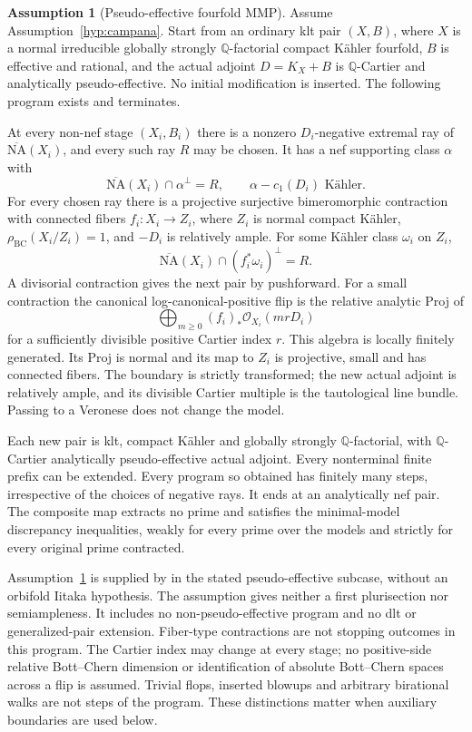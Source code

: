 \documentclass[11pt,letterpaper]{article}
\newcommand{\Q}{\mathbb{Q}}
\newcommand{\OO}{\mathcal{O}}
\newcommand{\NA}{\overline{\mathrm{NA}}}
\newcommand{\BC}{\mathrm{BC}}
\theoremstyle{definition}
\newtheorem{assumption}[theorem]{Assumption}
\theoremstyle{remark}
\begin{document}
\begin{assumption}[Pseudo-effective fourfold MMP]
\label{hyp:mmp}
Assume Assumption~\ref{hyp:campana}. Start from an ordinary klt pair
\((X,B)\), where \(X\) is a normal irreducible globally strongly
\(\Q\)-factorial compact K\"ahler fourfold, \(B\) is effective
and rational, and the actual adjoint \(D=K_X+B\) is
\(\Q\)-Cartier and analytically pseudo-effective. No initial
modification is inserted. The following program exists and
terminates.

At every non-nef stage \((X_i,B_i)\) there is a nonzero
\(D_i\)-negative extremal ray of \(\NA(X_i)\), and every such
ray \(R\) may be chosen. It has a nef supporting class \(\alpha\)
with
\[
 \NA(X_i)\cap\alpha^\perp=R,
 \qquad \alpha-c_1(D_i)\text{ K\"ahler}.
\]
For every chosen ray there is a projective surjective bimeromorphic
contraction with connected fibers
\(f_i:X_i\to Z_i\), where \(Z_i\) is normal compact K\"ahler,
\(\rho_{\BC}(X_i/Z_i)=1\), and \(-D_i\) is relatively ample.
For some K\"ahler class \(\omega_i\) on \(Z_i\),
\[
 \NA(X_i)\cap(f_i^*\omega_i)^\perp=R.
\]
A divisorial contraction gives the next pair by pushforward. For a
small contraction the canonical log-canonical-positive flip is the
relative analytic Proj of
\[
 \bigoplus_{m\ge0}(f_i)_*\OO_{X_i}(mrD_i)
\]
for a sufficiently divisible positive Cartier index \(r\). This
algebra is locally finitely generated. Its Proj is normal and its
map to \(Z_i\) is projective, small and has connected fibers. The
boundary is strictly transformed; the new actual adjoint is
relatively ample, and its divisible Cartier multiple is the
tautological line bundle. Passing to a Veronese does not change the
model.

Each new pair is klt, compact K\"ahler and globally strongly
\(\Q\)-factorial, with \(\Q\)-Cartier analytically
pseudo-effective actual adjoint. Every nonterminal finite prefix
can be extended. Every program so obtained has finitely many steps,
irrespective of the choices of negative rays. It ends at an
analytically nef pair. The composite map extracts no prime and
satisfies the minimal-model discrepancy inequalities, weakly for
every prime over the models and strictly for every original prime
contracted.
\end{assumption}

Assumption~\ref{hyp:mmp} is supplied by
\cite[Theorem~6.20; Proposition~3.4 and its proof]{GrantMMP}
in the stated pseudo-effective subcase, without an orbifold Iitaka
hypothesis. The assumption gives neither a first plurisection
nor semiampleness. It includes no non-pseudo-effective program and
no dlt or generalized-pair extension. Fiber-type contractions are
not stopping outcomes in this program. The Cartier index may change
at every stage; no positive-side relative Bott--Chern dimension or
identification of absolute Bott--Chern spaces across a flip is
assumed. Trivial flops, inserted blowups and arbitrary birational
walks are not steps of the program. These distinctions matter when
auxiliary boundaries are used below.
\end{document}
